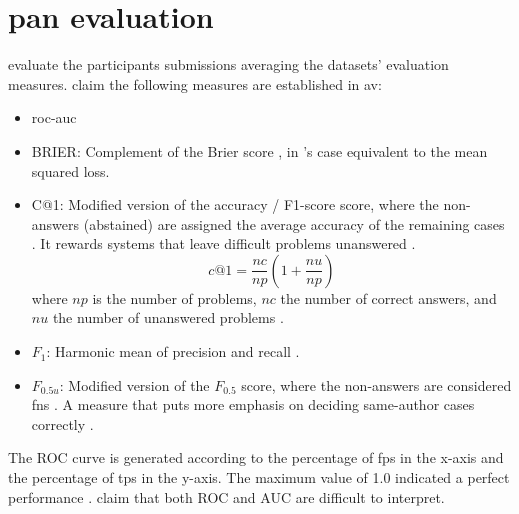 \section{\acs{pan} evaluation}
\label{sec:pan_evaluation}

\citet{ayele_overview_2024,bevendorff_overview_2024} evaluate the participants submissions averaging the datasets' evaluation measures.
\citet{ayele_overview_2024} claim the following measures are established in \ac{av}:
\begin{itemize}
    \item \ac{roc-auc} \cite{bevendorff_overview_2024,weerasinghe_feature_vector_difference_2021,kocher_unine_2015}
    \item BRIER: Complement of the Brier score \cite{bevendorff_overview_2024,weerasinghe_feature_vector_difference_2021}, in \citet{bevendorff_overview_2024}'s case equivalent to the mean squared loss.
    \item C@1: Modified version of the accuracy \cite{bevendorff_overview_2024}/ F1-score \cite{weerasinghe_feature_vector_difference_2021} score, 
    where the non-answers (abstained) are assigned the average accuracy of the remaining cases \cite{bevendorff_overview_2024}. 
    It rewards systems that leave difficult problems unanswered \cite{weerasinghe_feature_vector_difference_2021}.
    $$c@1 = \frac{nc}{np}(1+\frac{nu}{np})$$ where $np$ is the number of problems, $nc$ the number of correct answers, 
    and $nu$ the number of unanswered problems \cite{kocher_unine_2015}.
    \item $F_1$: Harmonic mean of precision and recall \cite{bevendorff_overview_2024,weerasinghe_feature_vector_difference_2021}.
    \item $F_{0.5u}$: Modified version of the $F_{0.5}$ score, where the non-answers are considered \acp{fn} \cite{bevendorff_overview_2024}. A measure that puts more emphasis on deciding same-author cases correctly \cite{weerasinghe_feature_vector_difference_2021}.
\end{itemize}

The ROC curve is generated according to the percentage of \acp{fp} in the x-axis and the percentage of \acp{tp} in the y-axis.
The maximum value of 1.0 indicated a perfect performance \cite{kocher_unine_2015}.
\citet{kocher_unine_2015} claim that both ROC and AUC are difficult to interpret.